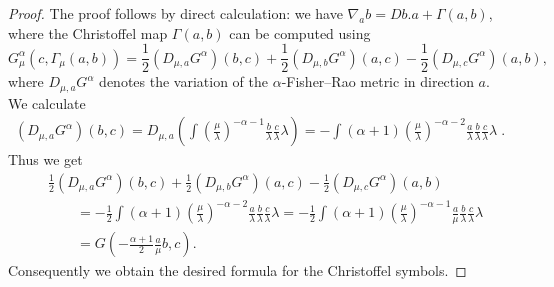 \documentclass[11pt,reqno]{amsart}
\theoremstyle{definition}
\newcommand{\dx}{\lambda}
\begin{document}
\begin{proof}
The proof follows by direct calculation: we have $\nabla_ab=Db.a+\Gamma(a,b)$, where the Christoffel map $\Gamma(a,b)$ can be computed using%
\begin{equation*}
G^{\alpha}_{\mu}(c,\Gamma_{\mu}(a,b))= \frac12\left(D_{\mu,a} G^{\alpha}\right)(b,c)+\frac12\left(D_{\mu,b} G^{\alpha}\right)(a,c)-\frac12\left(D_{\mu,c} G^{\alpha}\right)(a,b),
\end{equation*}
where $D_{\mu,a} G^{\alpha}$ denotes the variation of the $\alpha$-Fisher--Rao metric in direction $a$. We calculate
\begin{align*}
\left(D_{\mu,a} G^{\alpha}\right)(b,c)=  
D_{\mu,a}\left(\int \left(\frac{\mu}{\dx}\right)^{-\alpha-1} \frac{b}{\dx}\frac{c}{\dx}\dx\right)
=-\int (\alpha+1)\left(\frac{\mu}{\dx}\right)^{-\alpha-2}\frac{a}{\dx}\frac{b}{\dx}\frac{c}{\dx}\dx\;.
\end{align*}
Thus we get 
\begin{align*}
&\frac12 \left(D_{\mu,a} G^{\alpha}\right)(b,c)+\frac12\left(D_{\mu,b} G^{\alpha}\right)(a,c)-\frac12\left(D_{\mu,c} G^{\alpha}\right)(a,b)\\&\qquad=
-\frac12\int (\alpha+1)\left(\frac{\mu}{\dx}\right)^{-\alpha-2}\frac{a}{\dx}\frac{b}{\dx}\frac{c}{\dx}\dx=
-\frac12\int (\alpha+1)\left(\frac{\mu}{\dx}\right)^{-\alpha-1}\frac{a}{\mu}\frac{b}{\dx}\frac{c}{\dx}\dx\\
&\qquad=G\left(-\frac{\alpha+1}{2} \frac{a}{\mu}b,c\right).
\end{align*}
Consequently we obtain the desired formula for the Christoffel symbols. 




\end{proof}
\end{document}
